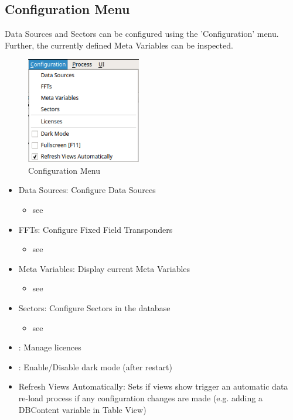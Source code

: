 \subsection{Configuration Menu}
\label{sec:ui_overview_config_menu}

Data Sources and Sectors can be configured using the 'Configuration' menu. Further, the currently defined Meta Variables can be inspected.

\begin{figure}[H]
  \center
    \includegraphics[width=5cm,frame]{figures/ui_configuration_menu.png}
  \caption{Configuration Menu}
\end{figure}

\begin{itemize}
 \item Data Sources: Configure Data Sources
  \begin{itemize}
   \item see 
  \end{itemize}
 \item FFTs: Configure Fixed Field Transponders
  \begin{itemize}
   \item see 
  \end{itemize}
 \item Meta Variables: Display current Meta Variables
  \begin{itemize}
   \item see 
  \end{itemize}
 \item Sectors: Configure Sectors in the database
  \begin{itemize}
   \item see 
  \end{itemize}
 \item {}: Manage licences
 \item {}: Enable/Disable dark mode (after restart)
 \item Refresh Views Automatically: Sets if views show trigger an automatic data re-load process if any configuration changes are made (e.g. adding a DBContent variable in Table View)
\end{itemize}
\  \\ 

